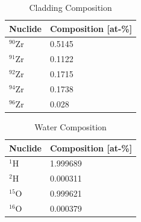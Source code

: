     \begin{table}[<options>]
        \caption{Cladding Composition}
        \label{tab:clad-comp}
        \begin{tabular*}{\tblwidth}{@{}LL@{}}
            \toprule
            Nuclide & Composition [at-\%] \\ %
            \midrule
             $^{90}$Zr & 0.5145 \\
             $^{91}$Zr & 0.1122 \\
             $^{92}$Zr & 0.1715 \\
             $^{94}$Zr & 0.1738 \\
             $^{96}$Zr & 0.028 \\ 
             \bottomrule
        \end{tabular*}
    \end{table}

    \begin{table}[<options>]
        \caption{Water Composition}
        \label{tab:water-comp}
        \begin{tabular*}{\tblwidth}{@{}LL@{}}
            \toprule
            Nuclide & Composition [at-\%] \\ %
            \midrule
             $^{1}$H & 1.999689\\
             $^{2}$H & 0.000311 \\
             $^{15}$O & 0.999621 \\
             $^{16}$O & 0.000379 \\
             \bottomrule
        \end{tabular*}
    \end{table}

